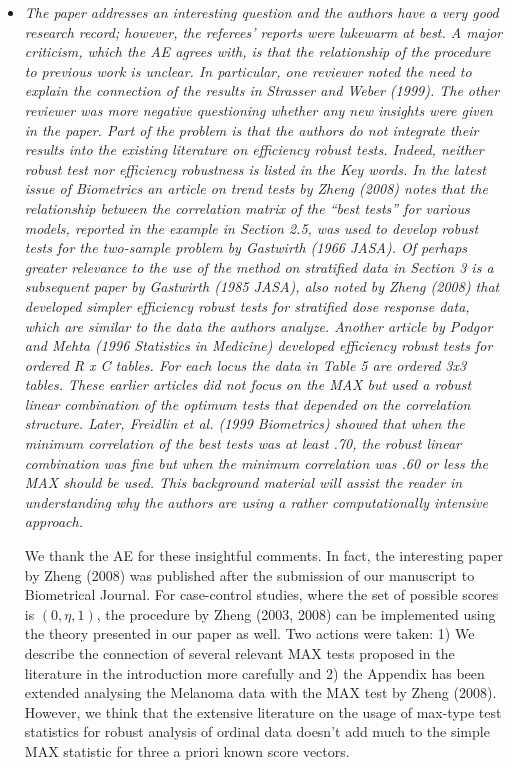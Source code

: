\documentclass{article}
\begin{document}
\begin{itemize}
\item 
\textit{
The paper addresses an interesting question and the authors have a very good
research record; however, the referees’ reports were lukewarm at best. A major criticism,
which the AE agrees with, is that the relationship of the procedure to previous work is
unclear. In particular, one reviewer noted the need to explain the connection of the results
in Strasser and Weber (1999). The other reviewer was more negative questioning whether
any new insights were given in the paper. Part of the problem is that the authors do not
integrate their results into the existing literature on efficiency robust tests. Indeed, neither
robust test nor efficiency robustness is listed in the Key words. In the latest issue of
Biometrics an article on trend tests by Zheng (2008) notes that the relationship between
the correlation matrix of the “best tests” for various models, reported in the example in
Section 2.5, was used to develop robust tests for the two-sample problem by Gastwirth
(1966 JASA). Of perhaps greater relevance to the use of the method on stratified data in
Section 3 is a subsequent paper by Gastwirth (1985 JASA), also noted by Zheng (2008)
that developed simpler efficiency robust tests for stratified dose response data, which are
similar to the data the authors analyze. Another article by Podgor and Mehta (1996
Statistics in Medicine) developed efficiency robust tests for ordered R x C tables. For
each locus the data in Table 5 are ordered 3x3 tables. These earlier articles did not focus
on the MAX but used a robust linear combination of the optimum tests that depended on
the correlation structure. Later, Freidlin et al. (1999 Biometrics) showed that when the
minimum correlation of the best tests was at least .70, the robust linear combination was
fine but when the minimum correlation was .60 or less the MAX should be used. This
background material will assist the reader in understanding why the authors are using a
rather computationally intensive approach.}

We thank the AE for these insightful comments. In fact, the interesting
paper by Zheng (2008) was published after the submission of our manuscript
to Biometrical Journal. For case-control studies, where the set of
possible scores is $(0, \eta, 1)$, the procedure by Zheng (2003, 2008)
can be implemented using the theory presented in our paper as well.
Two actions were taken: 1) We describe the connection of several relevant MAX
tests proposed in the literature in the introduction more carefully 
and 2) the Appendix has been extended analysing the Melanoma data with
the MAX test by Zheng (2008). However, we think that the extensive literature
on the usage of max-type test statistics for robust analysis of 
ordinal data doesn't add much to the simple MAX statistic for three 
a priori known score vectors.


\end{itemize}
\end{document}
